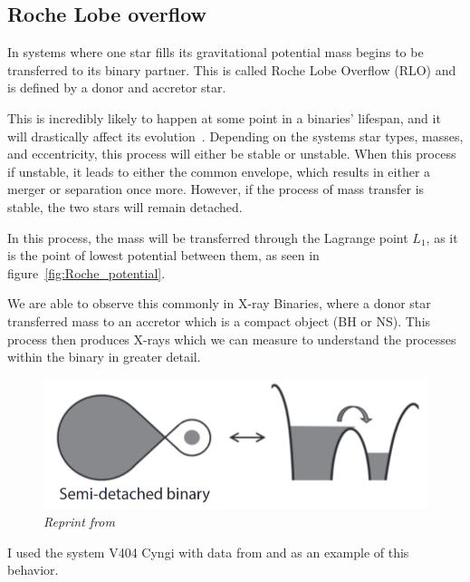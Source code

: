 \documentclass[12pt, letterpaper]{article}
\begin{document}
        \subsection{\centering Roche Lobe overflow} %
        In systems where one star fills its gravitational potential mass begins to be transferred to its binary partner. This is called Roche Lobe Overflow (RLO) and is defined by a donor and accretor star. 
        
        This is incredibly likely to happen at some point in a binaries' lifespan, and it will drastically affect its evolution~\cite{Chen_2024}. Depending on the systems star types, masses, and  eccentricity, this process will either be stable or unstable. When this process if unstable, it leads to either the common envelope, which results in either a merger or separation once more. However, if the process of mass transfer is stable, the two stars will remain detached.~\cite{Chen_2024}

        In this process, the mass will be transferred through the Lagrange point $L_1$, as it is the point of lowest potential between them, as seen in figure~\ref{fig:Roche_potential}. \cite{TaurisvandenHeuvel+2023}

        We are able to observe this commonly in X-ray Binaries, where a donor star transferred mass to an accretor which is a compact object (BH or NS). This process then produces X-rays which we can measure to understand the processes within the binary in greater detail.
        
       \begin{figure}[h] 
            \centering
            \includegraphics[scale = .4]{Figs/Semi-detached binary.png}
            \caption{\textit{Reprint from~\cite{TaurisvandenHeuvel+2023}}}
            \label{SemidetachedRL}
        \end{figure}
        
        I used the system V404 Cyngi with data from \cite{Bernardini_2016} and \cite{Shahbaz_1994} as an example of this behavior. 
\end{document}
